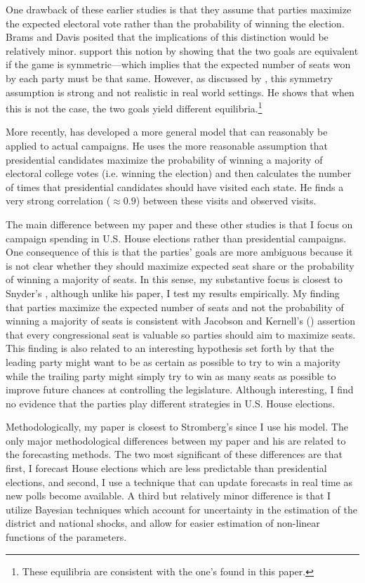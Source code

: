 \documentclass[12pt,final,fleqn]{article}
\theoremstyle{plain}
\begin{document}
One drawback of these earlier studies is that they assume that parties maximize the expected electoral vote rather than the probability of winning the election. Brams and Davis posited that the implications of this distinction would be relatively minor. \citet{aranson1974election} support this notion by showing that the two goals are equivalent if the game is symmetric---which implies that the expected number of seats won by each party must be that same. However, as discussed by \citet{snyder1989election}, this symmetry assumption is strong and not realistic in real world settings. He shows that when this is not the case, the two goals yield different equilibria.\footnote{These equilibria are consistent with the one's found in this paper.}

More recently, \citet{stromberg2008electoral} has developed a more general model that can reasonably be applied to actual campaigns. He uses the more reasonable assumption that presidential candidates maximize the probability of winning a majority of electoral college votes (i.e. winning the election) and then calculates the number of times that presidential candidates should have visited each state. He finds a very strong  correlation ($ \approx 0.9$) between these visits and observed visits. 

The main difference between my paper and these other studies is that I focus on campaign spending in U.S. House elections rather than presidential campaigns. One consequence of this is that the parties' goals are more ambiguous because it is not clear whether they should maximize expected seat share or the probability of winning a majority of seats. In this sense, my substantive focus is closest to Snyder's \citeyear{snyder1989election}, although unlike his paper, I test my results empirically. My finding that parties maximize the expected number of seats and not the probability of winning a majority of seats is consistent with Jacobson and Kernell's (\citeyear{jacobson1985party}) assertion that every congressional seat is valuable so parties should aim to maximize seats. This finding is also related to an interesting hypothesis set forth by \citet{snyder1989election} that the leading party might want to be as certain as possible to try to win a majority while the trailing party might simply try to win as many seats as possible to improve future chances at controlling the legislature. Although interesting, I find no evidence that the parties play different strategies in U.S. House elections.

Methodologically, my paper is closest to Stromberg's since I use his model. The only major methodological differences between my paper and his are related to the forecasting methods. The two most significant of these differences are that first, I forecast House elections which are less predictable than presidential elections, and second, I use a technique that can update forecasts in real time as new polls become available. A third but relatively minor difference is that I utilize Bayesian techniques which account for uncertainty in the estimation of the district and national shocks, and allow for easier estimation of non-linear functions of the parameters.
\end{document}
